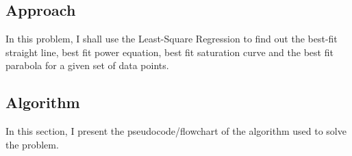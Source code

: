 \documentclass[titlepage, 11pt]{article}
\begin{document}
\subsection{Approach}

In this problem, I shall use the Least-Square Regression to find out the best-fit straight line, best fit power equation, best fit saturation curve and the best fit parabola for a given set of data points. 


\subsection{Algorithm}
In this section, I present the pseudocode/flowchart of the algorithm used to solve the problem.
\end{document}
